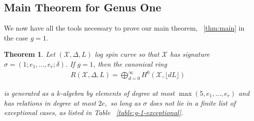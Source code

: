 \documentclass{amsart}
\theoremstyle{plain}
\newtheorem{thm}{Theorem}[section]
\theoremstyle{definition}
\newtheorem{example}[thm]{Example}
\theoremstyle{remark}
\numberwithin{equation}{section}
\newcommand\ssec{\subsection}
\newcommand \sx{\mathscr X}
\newcommand \di{\text{Div }}
\newcommand \halfcan{L}
\begin{document}
%
%
%


\ssec{Main Theorem for Genus One}
\label{ssec:main_g_1}

We now have all the tools necessary to prove our main theorem, ~\ref{thm:main} in the case $g = 1$. 

\begin{thm}
\label{thm:g-1-main}
Let $(\sx, \Delta, \halfcan)$ log spin curve so that $\sx$ has signature $\sigma = (1; e_1, \ldots, e_r; \delta)$.
If $g = 1$, then the canonical ring
\begin{align*}
	R(\sx, \Delta, \halfcan) = \bigoplus_{d = 0}^\infty H^0(\sx, \lfloor d L \rfloor)
\end{align*}

\noindent
is generated as a $k$-algebra by elements of degree at most $\max(5, e_1, \ldots, e_r)$ and has relations in degree at most $2e,$ so long as $\sigma$ does not lie in a
finite list of exceptional cases, as listed in Table
~\ref{table:g-1-exceptional}.
\end{thm}
\end{document}

